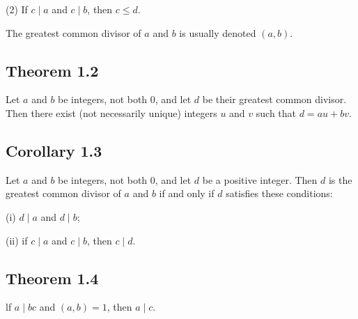 \documentclass{article}
\begin{document}
(2) If $c\mid a$ and $c \mid b$, then $c \leq d$.

The greatest common divisor of $a$ and $b$ is usually denoted $( a, b)$.

\subsection*{Theorem 1.2}
Let $a$ and $b$ be integers, not both $0$, and let $d$ be their greatest common divisor. 
Then there exist (not necessarily unique) integers $u$ and $v$ such that
$d =au+ bv$.

\subsection*{Corollary 1.3}
Let $a$ and $b$ be integers, not both $0$, and let $d$ be a positive integer. 
Then $d$ is the greatest common divisor of $a$ and $b$ 
if and only if $d$ satisfies these conditions:

(i) $d \mid a$ and $d\mid b$;

(ii) if $c\mid a$ and $c \mid b$, then $c \mid d$.


\subsection*{Theorem 1.4}
lf $a\mid bc$ and $( a, b) = 1$, then $a\mid c$. 
\end{document}
